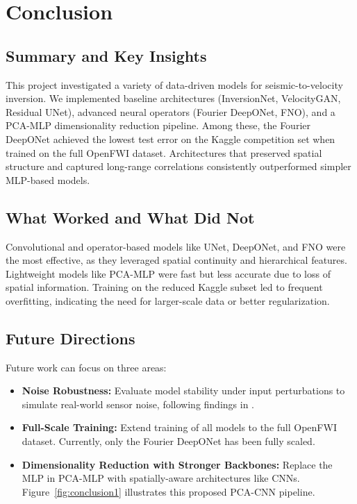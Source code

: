 \documentclass{article}
\newcommand{\instructions}[1]{{\color{blue} #1}}
\begin{document}
\section{Conclusion}

\subsection{Summary and Key Insights}

This project investigated a variety of data-driven models for seismic-to-velocity inversion. We implemented baseline architectures (InversionNet, VelocityGAN, Residual UNet), advanced neural operators (Fourier DeepONet, FNO), and a PCA-MLP dimensionality reduction pipeline. Among these, the Fourier DeepONet achieved the lowest test error on the Kaggle competition set when trained on the full OpenFWI dataset. Architectures that preserved spatial structure and captured long-range correlations consistently outperformed simpler MLP-based models.

\subsection{What Worked and What Did Not}

Convolutional and operator-based models like UNet, DeepONet, and FNO were the most effective, as they leveraged spatial continuity and hierarchical features. Lightweight models like PCA-MLP were fast but less accurate due to loss of spatial information. Training on the reduced Kaggle subset led to frequent overfitting, indicating the need for larger-scale data or better regularization.

\subsection{Future Directions}

Future work can focus on three areas:
\begin{itemize}[leftmargin=*, itemsep=1pt, topsep=2pt]
    \item \textbf{Noise Robustness:} Evaluate model stability under input perturbations to simulate real-world sensor noise, following findings in \cite{fdonet}.
    \item \textbf{Full-Scale Training:} Extend training of all models to the full OpenFWI dataset. Currently, only the Fourier DeepONet has been fully scaled.
    \item \textbf{Dimensionality Reduction with Stronger Backbones:} Replace the MLP in PCA-MLP with spatially-aware architectures like CNNs. Figure~\ref{fig:conclusion1} illustrates this proposed PCA-CNN pipeline.
\end{itemize}
\end{document}
